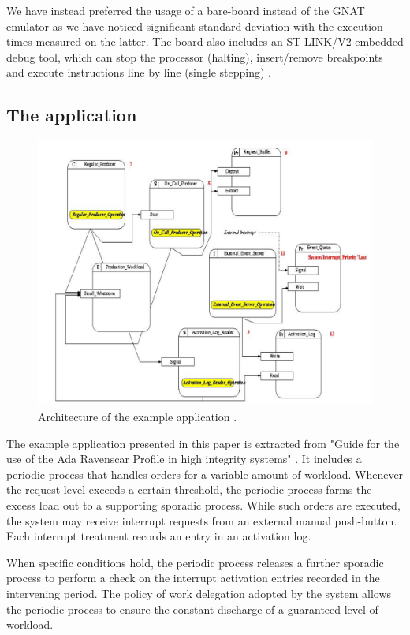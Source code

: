 \documentclass{article}
\begin{document}
We have instead preferred the usage of a bare-board instead of the GNAT emulator as we have noticed significant standard deviation with the execution times measured on the latter. The board also includes an ST-LINK/V2 embedded debug tool, which can stop the processor (halting), insert/remove breakpoints and execute instructions line by line (single stepping) \cite{debug-trace}.

\subsection{The application}

\begin{figure}[!htbp]
\centering
\includegraphics[width=5in]{images/ycs}
\caption{Architecture of the example application \cite{ycs}.}
\label{ycs}
\end{figure}

The example application presented in this paper is extracted from "Guide for the use of the
Ada Ravenscar Profile in
high integrity systems" \cite{ycs}. It includes a periodic process that handles orders for a variable amount of workload. Whenever the request level exceeds a certain threshold, the periodic process farms the excess load out to a supporting sporadic process. While such orders are executed, the system may receive interrupt requests from an external manual push-button. Each interrupt treatment records an entry in an activation log.

When specific conditions hold, the periodic process releases a further sporadic process to perform a check on the interrupt activation entries recorded in the intervening period. The policy of work delegation adopted by the system allows the periodic process to ensure the constant discharge of a guaranteed level of workload.
\end{document}
